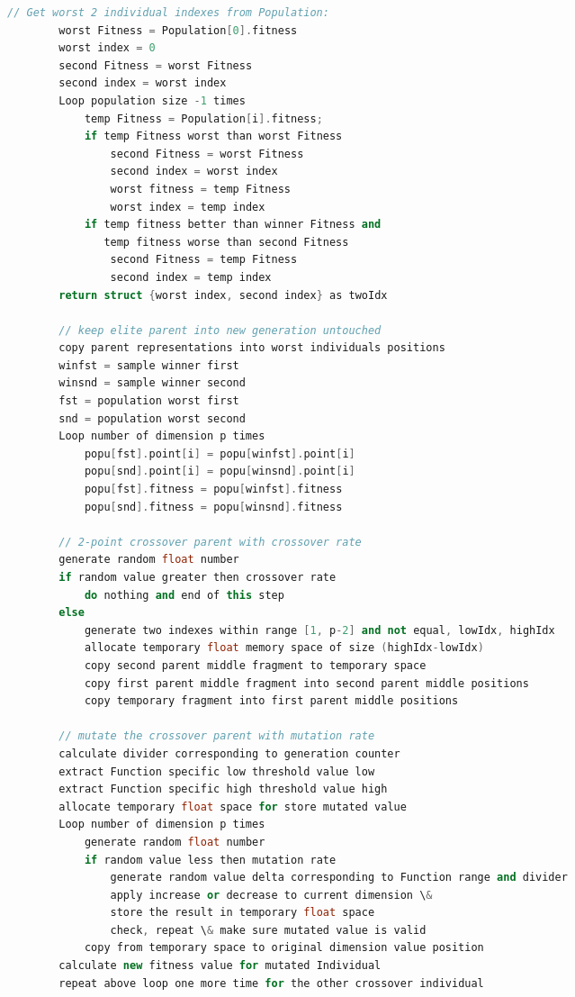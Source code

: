 \documentclass[b5paper,11pt, abstraction, titlepage]{scrartcl}
\begin{document}
\begin{CJK}{UTF8}{gbsn}
\begin{lstlisting}[language=c++]
        // Get worst 2 individual indexes from Population:  
        worst Fitness = Population[0].fitness
        worst index = 0
        second Fitness = worst Fitness
        second index = worst index
        Loop population size -1 times
            temp Fitness = Population[i].fitness;
            if temp Fitness worst than worst Fitness
                second Fitness = worst Fitness
                second index = worst index
                worst fitness = temp Fitness
                worst index = temp index
            if temp fitness better than winner Fitness and
               temp fitness worse than second Fitness
                second Fitness = temp Fitness
                second index = temp index
        return struct {worst index, second index} as twoIdx

        // keep elite parent into new generation untouched
        copy parent representations into worst individuals positions
        winfst = sample winner first
        winsnd = sample winner second
        fst = population worst first
        snd = population worst second
        Loop number of dimension p times
            popu[fst].point[i] = popu[winfst].point[i]
            popu[snd].point[i] = popu[winsnd].point[i]
            popu[fst].fitness = popu[winfst].fitness
            popu[snd].fitness = popu[winsnd].fitness

        // 2-point crossover parent with crossover rate
        generate random float number
        if random value greater then crossover rate
            do nothing and end of this step
        else
            generate two indexes within range [1, p-2] and not equal, lowIdx, highIdx
            allocate temporary float memory space of size (highIdx-lowIdx)
            copy second parent middle fragment to temporary space
            copy first parent middle fragment into second parent middle positions
            copy temporary fragment into first parent middle positions

        // mutate the crossover parent with mutation rate
        calculate divider corresponding to generation counter
        extract Function specific low threshold value low
        extract Function specific high threshold value high
        allocate temporary float space for store mutated value
        Loop number of dimension p times
            generate random float number
            if random value less then mutation rate
                generate random value delta corresponding to Function range and divider    
                apply increase or decrease to current dimension \&
                store the result in temporary float space
                check, repeat \& make sure mutated value is valid
            copy from temporary space to original dimension value position
        calculate new fitness value for mutated Individual    
        repeat above loop one more time for the other crossover individual


\end{lstlisting}
\end{CJK}
\end{document}
